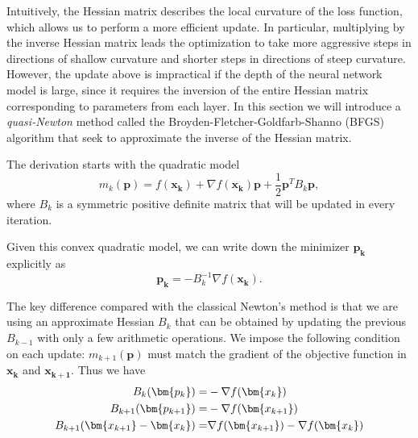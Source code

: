 Intuitively, the Hessian matrix describes the local curvature of the loss function, which allows us to perform a more efficient update. In particular, multiplying by the inverse Hessian matrix leads the optimization to take more aggressive steps in directions of shallow curvature and shorter steps in directions of steep curvature. However, the update above is impractical if the depth of the neural network model is large, since it requires the inversion of the entire Hessian matrix corresponding to parameters from each layer. In this section we will introduce a \textit{quasi-Newton} method called the Broyden-Fletcher-Goldfarb-Shanno (BFGS) algorithm that seek to approximate the inverse of the Hessian matrix. 

The derivation starts with the quadratic model
\begin{equation}
m_k(\bm{p}) = f(\bm{x_k}) + \nabla f(\bm{x_k})\bm{p} + \frac{1}{2}\bm{p}^TB_k\bm{p},
\end{equation}
where $B_k$ is a symmetric positive definite matrix that will be updated in every iteration.

Given this convex quadratic model, we can write down the minimizer $\bm{p_k}$ explicitly as
\begin{equation}
\bm{p_k}=-B_k^{-1}\nabla f(\bm{x_k}).
\end{equation}

The key difference compared with the classical Newton's method is that we are using an approximate Hessian $B_k$ that can be obtained by updating the previous $B_{k-1}$ with only a few arithmetic operations. We impose the following condition on each update: $m_{k+1}(\bm{p})$ must match the gradient of the objective function in $\bm{x_k}$ and $\bm{x_{k+1}}$. Thus we have
\begin{equation}
\aligned
B_k(\bm{p_k}) =& -\nabla f(\bm{x_k})\\
B_{k+1}(\bm{p_{k+1}}) =& -\nabla f(\bm{x_{k+1}})\\
B_{k+1}(\bm{x_{k+1}} - \bm{x_k}) =& \nabla f(\bm{x_{k+1}}) - \nabla f(\bm{x_k})\\
\endaligned
\end{equation}



